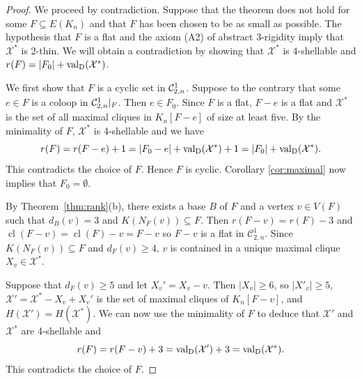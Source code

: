 \documentclass{daj}
\DeclareMathOperator{\cl}{cl}
\newcommand{\MC}{{\mathcal C}}
\newcommand{\MX}{{\mathcal X}}
\newcommand{\valD}{{\rm val}_{\rm D}}
\begin{document}
\begin{proof} We proceed by contradiction. Suppose that the theorem does not hold for some $F\subseteq E(K_n)$ and that $F$ has been chosen to be as small as possible. The hypothesis that $F$ is a flat and the axiom (A2) of abstract 3-rigidity imply that $\MX^*$ is 2-thin. We will obtain a contradiction by showing  that  $\MX^*$ is  $4$-shellable and
$r(F)=|F_0|+\valD(\MX^*)$.

We first show that $F$ is a cyclic set in ${\cal C}_{2,n}^1$.  Suppose to the contrary that some $e\in F$ is a coloop in  ${\cal C}_{2,n}^1|_F$. Then $e\in F_0$. Since $F$ is a flat, $F-e$ is a flat and $\MX^*$ is the set of all maximal cliques in $K_n[F-e]$ of size at least five. By 
the minimality of $F$, $\MX^*$ is 4-shellable and we have
$$r(F)=r(F-e)+1=|F_0-e|+\valD(\MX^*)+1=|F_0|+\valD(\MX^*).$$
This contradicts the choice of $F$. Hence $F$ is cyclic. Corollary \ref{cor:maximal} now implies that $F_0=\emptyset$.



By Theorem~\ref{thm:rank}(b),
there exists a base $B$ of $F$ and a vertex $v\in V(F)$ such that $d_B(v)=3$ and $K(N_F(v))\subseteq F$. Then $r(F-v)=r(F)-3$ and $\cl(F-v)=\cl(F)-v=F-v$ so $F-v$ is a flat in $\MC_{2,n}^1$. Since  $K(N_F(v))\subseteq F$ and $d_F(v)\geq 4$, $v$ is contained in a unique maximal clique $X_v\in \MX^*$.

Suppose that $d_F(v)\geq 5$ and let $X_v'=X_v-v$. Then $|X_v|\geq 6$, so $|X'_v|\geq 5$, $\MX'=\MX^*-X_v+X_v'$ is the set of maximal cliques of $K_n[F-v]$, and $H(\MX')=H(\MX^*)$. We can now use the minimality of $F$ to deduce that $\MX'$ and $\MX^*$ are 4-shellable and
$$r(F)=r(F-v)+3=\valD(\MX')+3=\valD(\MX^*).$$
This contradicts the choice of $F$.


\end{proof}
\end{document}
